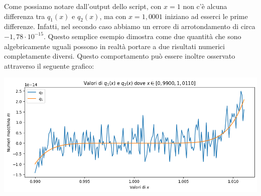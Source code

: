 \begin{example}
    Come possiamo notare dall'output dello script, con $x = 1$ non c'è alcuna differenza tra $q_1(x)$ e $q_2(x)$, ma con $x = 1,0001$ iniziano ad esserci le prime differenze. Infatti, nel secondo caso abbiamo un errore di arrotondamento di circa $-1,78 \cdot 10^{-15}$. Questo semplice esempio dimostra come due quantità che sono algebricamente uguali possono in realtà portare a due risultati numerici completamente diversi.
    \nl
    Questo comportamento può essere inoltre osservato attraverso il seguente grafico:
    \begin{center}
        \includegraphics[width = \linewidth]{assets/image-001.png}
    \end{center}
\end{example}

